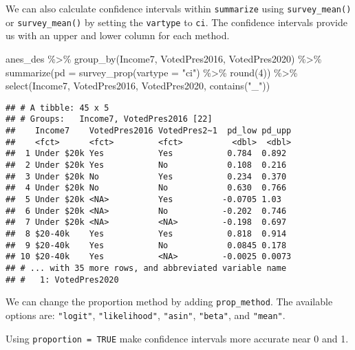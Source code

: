 \documentclass[
]{krantz}
\makeatletter
\newenvironment{Shaded}{\begin{snugshade}}{\end{snugshade}}
\newcommand{\AttributeTok}[1]{\textcolor[rgb]{0.61,0.61,0.61}{#1}}
\newcommand{\DecValTok}[1]{\textcolor[rgb]{0.06,0.06,0.06}{#1}}
\newcommand{\FunctionTok}[1]{\textcolor[rgb]{0,0,0}{#1}}
\newcommand{\NormalTok}[1]{#1}
\newcommand{\SpecialCharTok}[1]{\textcolor[rgb]{0,0,0}{#1}}
\newcommand{\StringTok}[1]{\textcolor[rgb]{0.5,0.5,0.5}{#1}}
\newenvironment{kframe}{%
\medskip{}
\setlength{\fboxsep}{.8em}
 \def\at@end@of@kframe{}%
 \ifinner\ifhmode%
  \def\at@end@of@kframe{\end{minipage}}%
  \begin{minipage}{\columnwidth}%
 \fi\fi%
 \def\FrameCommand##1{\hskip\@totalleftmargin \hskip-\fboxsep
 \colorbox{shadecolor}{##1}\hskip-\fboxsep
     \hskip-\linewidth \hskip-\@totalleftmargin \hskip\columnwidth}%
 \MakeFramed {\advance\hsize-\width
   \@totalleftmargin\z@ \linewidth\hsize
   \@setminipage}}%
 {\par\unskip\endMakeFramed%
 \at@end@of@kframe}
\renewenvironment{Shaded}{\begin{kframe}}{\end{kframe}}
\makeatother
\begin{document}
We can also calculate confidence intervals within \texttt{summarize} using \texttt{survey\_mean()} or \texttt{survey\_mean()} by setting the \texttt{vartype} to \texttt{ci}. The confidence intervals provide us with an upper and lower column for each method.

\begin{Shaded}
\begin{Highlighting}[]
\NormalTok{anes\_des }\SpecialCharTok{\%\textgreater{}\%}
  \FunctionTok{group\_by}\NormalTok{(Income7, VotedPres2016, VotedPres2020) }\SpecialCharTok{\%\textgreater{}\%}
  \FunctionTok{summarize}\NormalTok{(}\AttributeTok{pd =} \FunctionTok{survey\_prop}\NormalTok{(}\AttributeTok{vartype =} \StringTok{"ci"}\NormalTok{) }\SpecialCharTok{\%\textgreater{}\%} \FunctionTok{round}\NormalTok{(}\DecValTok{4}\NormalTok{)) }\SpecialCharTok{\%\textgreater{}\%}
  \FunctionTok{select}\NormalTok{(Income7, VotedPres2016, VotedPres2020, }\FunctionTok{contains}\NormalTok{(}\StringTok{"\_"}\NormalTok{))}
\end{Highlighting}
\end{Shaded}

\begin{verbatim}
## # A tibble: 45 x 5
## # Groups:   Income7, VotedPres2016 [22]
##    Income7    VotedPres2016 VotedPres2~1  pd_low pd_upp
##    <fct>      <fct>         <fct>          <dbl>  <dbl>
##  1 Under $20k Yes           Yes           0.784  0.892 
##  2 Under $20k Yes           No            0.108  0.216 
##  3 Under $20k No            Yes           0.234  0.370 
##  4 Under $20k No            No            0.630  0.766 
##  5 Under $20k <NA>          Yes          -0.0705 1.03  
##  6 Under $20k <NA>          No           -0.202  0.746 
##  7 Under $20k <NA>          <NA>         -0.198  0.697 
##  8 $20-40k    Yes           Yes           0.818  0.914 
##  9 $20-40k    Yes           No            0.0845 0.178 
## 10 $20-40k    Yes           <NA>         -0.0025 0.0073
## # ... with 35 more rows, and abbreviated variable name
## #   1: VotedPres2020
\end{verbatim}

We can change the proportion method by adding \texttt{prop\_method}. The available options are: \texttt{"logit"}, \texttt{"likelihood"}, \texttt{"asin"}, \texttt{"beta"}, and \texttt{"mean"}.

Using \texttt{proportion\ =\ TRUE} make confidence intervals more accurate near 0 and 1.
\end{document}
